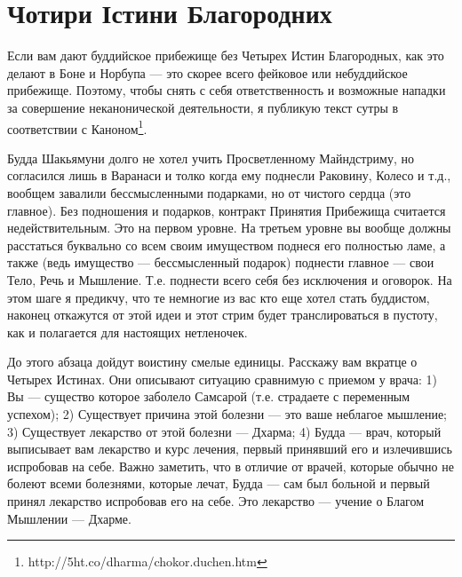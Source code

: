 \section{Чотири Істини Благородних}

Если вам дают буддийское прибежище без Четырех Истин Благородных,
как это делают в Боне и Норбупа — это скорее всего фейковое или
небуддийское прибежище. Поэтому, чтобы снять с себя ответственность
и возможные нападки за совершение неканонической деятельности,
я публикую текст сутры в соответствии с Каноном\footnote{http://5ht.co/dharma/chokor.duchen.htm}.

Будда Шакьямуни долго не хотел учить Просветленному Майндстриму,
но согласился лишь в Варанаси и толко когда ему поднесли Раковину,
Колесо и т.д., вообщем завалили бессмысленными подарками,
но от чистого сердца (это главное). Без подношения и подарков,
контракт Принятия Прибежища считается недействительным. Это на
первом уровне. На третьем уровне вы вообще должны расстаться
буквально со всем своим имуществом поднеся его полностью ламе,
а также (ведь имущество — бессмысленный подарок) поднести
главное — свои Тело, Речь и Мышление. Т.е. поднести всего
себя без исключения и оговорок. На этом шаге я предикчу, что
те немногие из вас кто еще хотел стать буддистом, наконец откажутся
от этой идеи и этот стрим будет транслироваться в пустоту, как и
полагается для настоящих нетленочек.

До этого абзаца дойдут воистину смелые единицы. Расскажу вам
вкратце о Четырех Истинах. Они описывают ситуацию сравнимую
с приемом у врача: 1) Вы — существо которое заболело Самсарой (т.е.
страдаете с переменным успехом); 2) Существует причина этой
болезни — это ваше неблагое мышление; 3) Существует лекарство
от этой болезни — Дхарма; 4) Будда — врач, который выписывает
вам лекарство и курс лечения, первый принявший его и излечившись
испробовав на себе. Важно заметить, что в отличие от врачей,
которые обычно не болеют всеми болезнями, которые лечат,
Будда — сам был больной и первый принял лекарство испробовав
его на себе. Это лекарство — учение о Благом Мышлении — Дхарме. 


